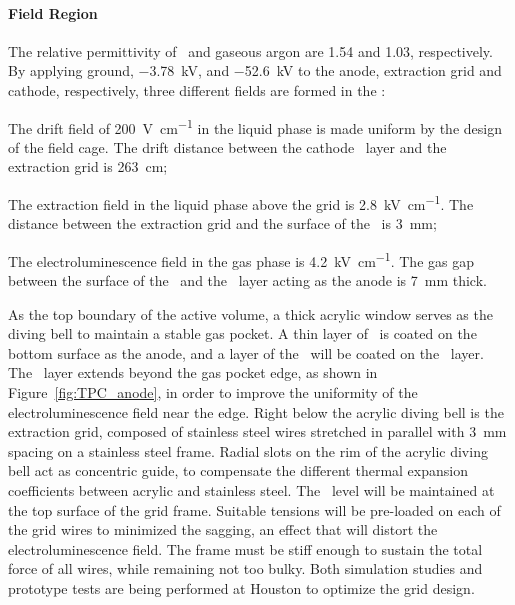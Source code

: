 \paragraph{Field Region}

The relative permittivity of \LAr\ and gaseous argon are \num{1.54} and \num{1.03}, respectively.  By applying ground, \SI{-3.78}{\kV}, and \SI{-52.6}{\kV} to the anode, extraction grid and cathode, respectively, three different fields are formed in the \TPC:

\begin{compactitem}
\item The drift field of \SI{200}{\V\per\cm} in the liquid phase is made uniform by the design of the field cage. The drift distance between the cathode \ITO\ layer and the extraction grid is \SI{263}{\cm};
\item The extraction field in the liquid phase above the grid is \SI{2.8}{\kV\per\cm}. The distance between the extraction grid and the surface of the \LAr\ is \SI{3}{\mm};
\item The electroluminescence field in the gas phase is \SI{4.2}{\kV\per\cm}. The gas gap between the surface of the \LAr\ and the \ITO\ layer acting as the anode is \SI{7}{\mm} thick.
\end{compactitem}

As the top boundary of the active volume, a \DSkPMMATPCThickness thick acrylic window serves as the diving bell to maintain a stable gas pocket. A thin layer of \ITO\ is coated on the bottom surface as the anode, and a layer of the \TPB\ will be coated on the \ITO\ layer.
The \ITO\ layer extends beyond the gas pocket edge, as shown in Figure~\ref{fig:TPC_anode}, in order to improve the uniformity of the electroluminescence field near the edge. Right below the acrylic diving bell is the extraction grid, composed of stainless steel wires stretched in parallel with \SI{3}{\mm} spacing on a stainless steel frame. Radial slots on the rim of the acrylic diving bell act as concentric guide, to compensate the different thermal expansion coefficients between acrylic and stainless steel.
The \LAr\ level will be maintained at the top surface of the grid frame.
Suitable tensions will be pre-loaded on each of the grid wires to minimized the sagging, an effect that will distort the electroluminescence field. The frame must be stiff enough to sustain the total force of all wires, while remaining not too bulky. Both simulation studies and prototype tests are being performed at Houston to optimize the grid design.

